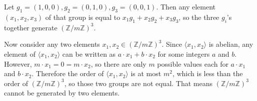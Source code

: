 \documentclass[12pt]{article}
\begin{document}
\section{}
\noindent{}\bigskip

\section{}
\noindent{}\bigskip

Let $g_1 = (1,0,0), g_2 = (0,1,0), g_3 = (0,0,1)$. Then any element $(x_1,x_2,x_3)$ of that group is equal to $x_1 g_1 + x_2 g_2 + x_3 g_3$, so the three $g_i$'s together generate $( \mathbb{Z}/m \mathbb{Z})^3$.
\bigskip
\par
Now consider any two elements $x_1, x_2 \in (\mathbb{Z}/m\mathbb{Z})^3$. Since $\langle x_1, x_2 \rangle$ is abelian, any element of $\langle x_1, x_2 \rangle$ can be written as $a \cdot x_1 + b \cdot x_2$ for some integers $a$ and $b$. However, $m \cdot x_1 = 0 = m \cdot x_2$, so there are only $m$ possible values each for $a \cdot x_1$ and $b \cdot x_2$. Therefore the order of $\langle x_1, x_2 \rangle$ is at most $m^2$, which is less than the order of $( \mathbb{Z}/m \mathbb{Z})^3$, so those two groups are not equal. That means $( \mathbb{Z}/m \mathbb{Z})^3$ cannot be generated by two elements.

\section{}
\noindent{}\bigskip
\end{document}
